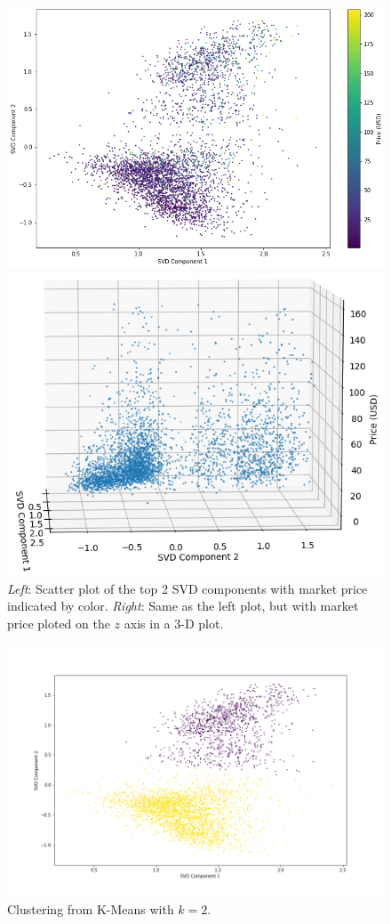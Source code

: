 \documentclass[12pt]{article}
\begin{document}
\begin{figure}[t]
\centering
\begin{minipage}{.49\textwidth}
\centering
\includegraphics[width=\textwidth]{svd_price_2d.png}
\end{minipage} \hfill
\begin{minipage}{.49\textwidth}
\centering
\includegraphics[width=\textwidth]{svd_price_3d.png}
\end{minipage}
\caption{\small \textit{Left}: Scatter plot of the top 2 SVD components with market price indicated by color. \textit{Right}: Same as the left plot, but with market price ploted on the $z$ axis in a 3-D plot.}
\end{figure}

\begin{figure}[t]
\centering
\includegraphics[width=\textwidth]{svd_clusters.png}
\caption{\small Clustering from K-Means with $k=2$.}
\end{figure}
\end{document}
